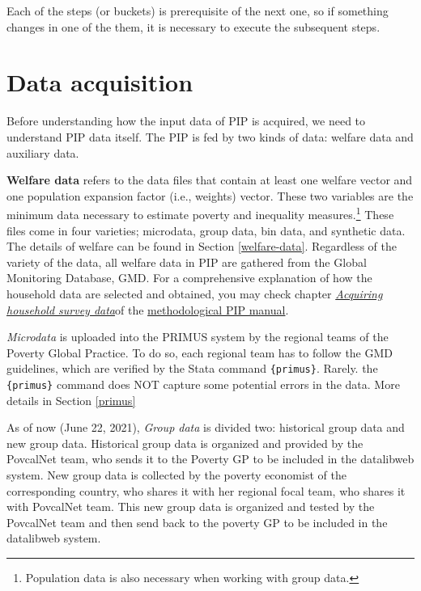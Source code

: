 \documentclass[
]{book}
\begin{document}
Each of the steps (or buckets) is prerequisite of the next one, so if something
changes in one of the them, it is necessary to execute the subsequent steps.

\hypertarget{data-acquisition}{%
\section{Data acquisition}\label{data-acquisition}}

Before understanding how the input data of PIP is acquired, we need to
understand PIP data itself. The PIP is fed by two kinds of data: welfare data
and auxiliary data.

\textbf{Welfare data} refers to the data files that contain at least one welfare
vector and one population expansion factor (i.e., weights) vector. These two
variables are the minimum data necessary to estimate poverty and inequality
measures.\footnote{Population data is also necessary when working with
  group data.} These files come in four varieties; microdata,
group data, bin data, and synthetic data. The details of welfare can be found in
Section \ref{welfare-data}. Regardless of the variety of the data, all welfare
data in PIP are gathered from the Global Monitoring Database, GMD. For a
comprehensive explanation of how the household data are selected and obtained,
you may check chapter \href{https://povcalnet-team.github.io/Methodology/acquiring.html}{\emph{Acquiring household survey
data}}of the
\href{https://povcalnet-team.github.io/Methodology/index.html}{methodological PIP
manual}.

\emph{Microdata} is uploaded into the PRIMUS system by the regional teams of the
Poverty Global Practice. To do so, each regional team has to follow the GMD
guidelines, which are verified by the Stata command \texttt{\{primus\}}. Rarely. the
\texttt{\{primus\}} command does NOT capture some potential errors in the data. More
details in Section \ref{primus}

As of now (June 22, 2021), \emph{Group data} is divided two:
historical group data and new group data. Historical group data is organized and
provided by the PovcalNet team, who sends it to the Poverty GP to be included in
the datalibweb system. New group data is collected by the poverty economist of
the corresponding country, who shares it with her regional focal team, who
shares it with PovcalNet team. This new group data is organized and tested by
the PovcalNet team and then send back to the poverty GP to be included in the
datalibweb system.
\end{document}

